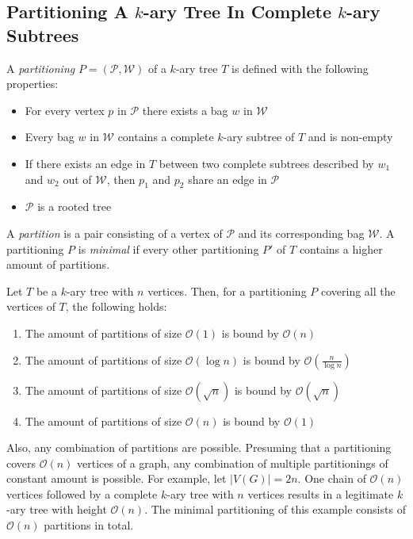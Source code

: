 \subsection{Partitioning A $k$-ary Tree In Complete $k$-ary Subtrees}
\begin{definition}
	A \emph{partitioning} $P = (\mathcal{P},\mathcal{W})$ of a $k$-ary tree $T$ is defined with the following properties:
	\begin{itemize}
		\item For every vertex $p$ in $\mathcal{P}$ there exists a bag $w$ in $\mathcal{W}$
		\item Every bag $w$ in $\mathcal{W}$ contains a complete $k$-ary subtree of $T$ and is non-empty
		\item If there exists an edge in $T$ between two complete subtrees described by $w_1$ and $w_2$ out of $\mathcal{W}$, then $p_1$ and $p_2$ share an edge in $\mathcal{P}$
		\item $\mathcal{P}$ is a rooted tree		
	\end{itemize}
	A \emph{partition} is a pair consisting of a vertex of $\mathcal{P}$ and its corresponding bag $\mathcal{W}$. A partitioning $P$ is \emph{minimal} if every other partitioning $P'$ of $T$ contains a higher amount of partitions.
\end{definition}
Let $T$ be a $k$-ary tree with $n$ vertices. Then, for a partitioning $P$ covering all the vertices of $T$, the following holds:
\begin{enumerate}
	\item The amount of partitions of size $\mathcal{O}(1)$ is bound by $\mathcal{O}(n)$
	\item The amount of partitions of size $\mathcal{O}(\log n)$ is bound by $\mathcal{O}\left(\frac{n}{\log n}\right)$
	\item The amount of partitions of size $\mathcal{O}(\sqrt{n})$ is bound by $\mathcal{O}(\sqrt{n})$
	\item The amount of partitions of size $\mathcal{O}(n)$ is bound by $\mathcal{O}(1)$
\end{enumerate}
Also, any combination of partitions are possible. Presuming that a partitioning covers $\mathcal{O}(n)$ vertices of a graph, any combination of multiple partitionings of constant amount is possible. For example, let $|V(G)| = 2n$. One chain of $\mathcal{O}(n)$ vertices followed by a complete $k$-ary tree with $n$ vertices results in a legitimate $k$-ary tree with height $\mathcal{O}(n)$. The minimal partitioning of this example consists of $\mathcal{O}(n)$ partitions in total.
